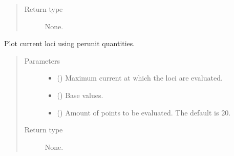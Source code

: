 \documentclass[letterpaper,10pt,english]{sphinxmanual}
\begin{document}
\begin{fulllineitems}
\begin{fulllineitems}
\begin{quote}
\begin{description}
\begin{itemize}
\end{itemize}

\item[{Return type}] \leavevmode
\sphinxAtStartPar
None.

\end{description}\end{quote}

\end{fulllineitems}


\begin{fulllineitems}
\label{\detokenize{control.sm:control.sm.torque.TorqueCharacteristics.plot_current_loci}}
\pysigstartsignatures
{}
\pysigstopsignatures
\sphinxAtStartPar
Plot current loci using per\sphinxhyphen{}unit quantities.
\begin{quote}\begin{description}
\item[{Parameters}] \leavevmode\begin{itemize}
\item {} 
\sphinxAtStartPar
{} () \textendash{} Maximum current at which the loci are evaluated.

\item {} 
\sphinxAtStartPar
{} () \textendash{} Base values.

\item {} 
\sphinxAtStartPar
{} (\sphinxstyleliteralemphasis{\sphinxupquote{, }}) \textendash{} Amount of points to be evaluated. The default is 20.

\end{itemize}

\item[{Return type}] \leavevmode
\sphinxAtStartPar
None.

\end{description}\end{quote}


\end{fulllineitems}
\end{fulllineitems}
\end{document}
